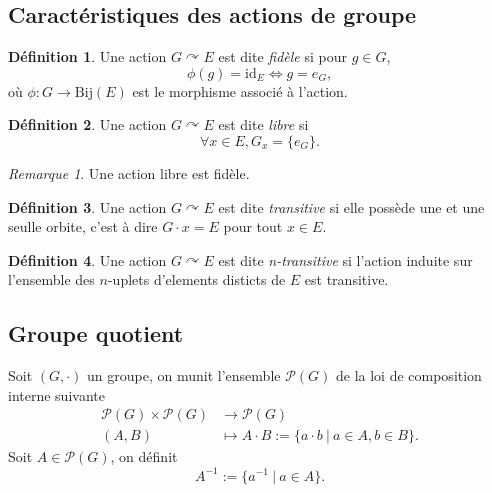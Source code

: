 \documentclass[french]{article}
\theoremstyle{plain}
\theoremstyle{remark}
\newtheorem*{rmq}{Remarque}
\theoremstyle{definition}
\newtheorem{defn}{Définition}[section]
\newcommand{\Bij}{\mathrm{Bij}}
\newcommand{\id}{\mathrm{id}}
\newcommand{\agitg}{\curvearrowright}
\begin{document}
\subsection{Caractéristiques des actions de groupe}

\begin{defn}
	Une action $G \agitg E$ est dite \emph{fidèle} si pour $g \in G$,
	\begin{equation*}
		\phi(g) = \id_E \iff g = e_G,
	\end{equation*}
	où $\phi : G \to \Bij(E)$ est le morphisme associé à l'action.
\end{defn}

\begin{defn}
	Une action $G \agitg E$ est dite \emph{libre} si
	\begin{equation*}
		\forall x \in E, G_x = \{e_G\}.
	\end{equation*}
\end{defn}

\begin{rmq}
	Une action libre est fidèle.	
\end{rmq}

\begin{defn}
	Une action $G \agitg E$ est dite \emph{transitive} si elle
	possède une et une seulle orbite, c'est à dire $G \cdot x = E$ pour tout $x \in E$.
\end{defn}

\begin{defn}
	Une action $G \agitg E$ est dite \emph{n-transitive} si l'action induite sur
	l'ensemble des $n$-uplets d'elements disticts de $E$ est transitive.
\end{defn}

\subsection{Groupe quotient}

Soit $(G, \cdot)$ un groupe, on munit l'ensemble $\mathcal{P}(G)$
de la loi de composition interne suivante
\begin{align*}
	\mathcal{P}(G) \times \mathcal{P}(G) &\to \mathcal{P}(G)\\
	(A, B) &\mapsto A \cdot B := \{a \cdot b\ |\ a \in A, b \in B\}.
\end{align*}
Soit $A \in \mathcal{P}(G)$, on définit
\begin{equation*}
	A^{-1} := \{a^{-1}\ |\ a \in A\}.
\end{equation*}
\end{document}
